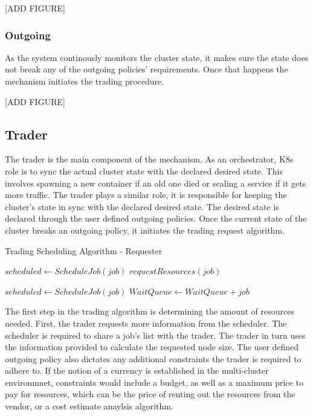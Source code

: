 [ADD FIGURE]

\subsubsection{Outgoing}

As the system continously monitors the cluster state, it makes sure the state
does not break any of the outgoing policies' requirements. Once that happens
the mechanism initiates the trading procedure. 

[ADD FIGURE]

\subsection{Trader}

The trader is the main component of the mechanism. As an orchestrator, K8s role
is to sync the actual cluster state with the declared desired state. This
involves spawning a new container if an old one died or scaling a service if it
gets more traffic. The trader plays a similar role, it is responsible for
keeping the cluster's state in sync with the declared desired state. The
desired state is declared through the user defined outgoing policies. Once the
current state of the cluster breaks an outgoing policy, it initiates the
trading request algorithm. 
\begin{algorithm}[H]
\caption{Trading Scheduling Algorithm - Requester}
\begin{algorithmic}
        \State $scheduled \gets ScheduleJob(job)$
        \State $requestResources(job)$
        \EndIf
    \EndFor

        \State $scheduled \gets ScheduleJob(job)$
        \State $WaitQueue \gets WaitQueue + job$
        \EndIf
    \EndFor
\end{algorithmic}
\end{algorithm}

The first step in the trading algorithm is determining the amount of resources
needed. First, the trader requests more information from the scheduler. The
scheduler is required to share a job's list with the trader. The trader in turn
uses the information provided to calculate the requested node size. The user
defined outgoing policy also dictates any additional constraints the trader is
required to adhere to. If the notion of a currency is established in the
multi-cluster environmnet, constraints would include a budget, as well as a
maximum price to pay for resources, which can be the price of renting out the
resources from the vendor, or a cost estimate anaylsis algorithm. 

